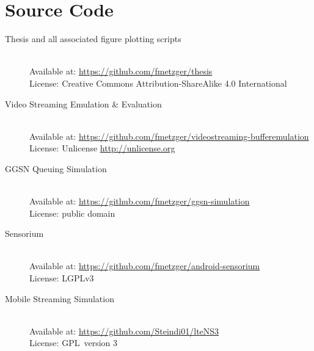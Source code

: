 \chapter*{Source Code}
%

\begin{description}
	\item[Thesis and all associated figure plotting scripts]\hfill \\
	Available at: \url{https://github.com/fmetzger/thesis} \\ %
	License: Creative Commons Attribution-ShareAlike 4.0 International \cite{ccbysa40}

	\item[Video Streaming Emulation \& Evaluation]\hfill \\
	Available at: \url{https://github.com/fmetzger/videostreaming-bufferemulation} \\
	License: Unlicense \url{http://unlicense.org}

	\item[\acrshort{GGSN} Queuing Simulation]\hfill \\
	Available at: \url{https://github.com/fmetzger/ggsn-simulation} \\
	License: public domain

	\item[Sensorium]\hfill \\
	Available at: \url{https://github.com/fmetzger/android-sensorium} \\
	License: \gls{LGPLv3}~\cite{lgplv3}

	\item[Mobile Streaming Simulation]\hfill \\
	Available at: \url{https://github.com/Steindi01/lteNS3} \\
	License: \gls{GPL}~version 3~\cite{gplv3}

\end{description}